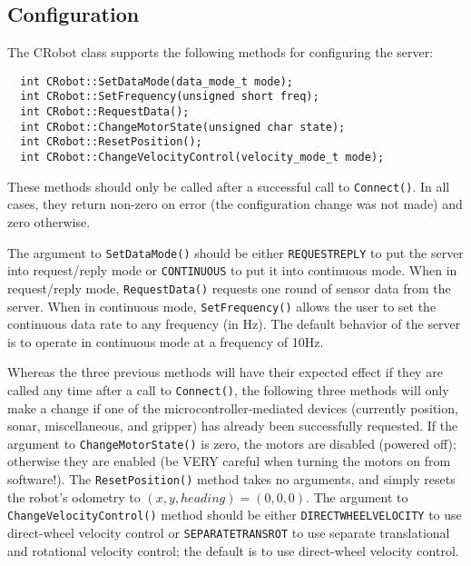 \documentclass[11pt]{article}
\begin{document}
\subsection{Configuration}
The CRobot class supports the following methods for configuring the 
server:

\begin{verbatim}
  int CRobot::SetDataMode(data_mode_t mode);
  int CRobot::SetFrequency(unsigned short freq);
  int CRobot::RequestData();
  int CRobot::ChangeMotorState(unsigned char state);
  int CRobot::ResetPosition();
  int CRobot::ChangeVelocityControl(velocity_mode_t mode);
\end{verbatim}

These methods should only be called after a successful call to
{\tt Connect()}.  In all cases, they return non-zero on error
(the configuration change was not made) and zero otherwise.

The argument to {\tt SetDataMode()} should be either {\tt REQUESTREPLY}
to put the server into request/reply mode or {\tt CONTINUOUS} to 
put it into continuous mode. When in request/reply mode,
{\tt RequestData()} requests one round of sensor data from the server.
When in continuous mode, {\tt SetFrequency()} allows
the user to set the continuous data rate to any frequency (in Hz). 
The default behavior of the server is to operate in continuous mode
at a frequency of 10Hz. 

Whereas the three previous methods will have their expected effect
if they are called any time after a call to {\tt Connect()}, the
following three methods will only make a change if one of the
microcontroller-mediated devices (currently position, sonar, miscellaneous,
and gripper) has already been successfully requested.
If the argument to {\tt ChangeMotorState()} is zero, the motors
are disabled (powered off); otherwise they are enabled (be VERY careful
when turning the motors on from software!).  The {\tt ResetPosition()}
method takes no arguments, and simply resets the robot's 
odometry to $(x,y,heading) = (0,0,0)$.
 The argument to {\tt ChangeVelocityControl()}
method should be either {\tt DIRECTWHEELVELOCITY} to use direct-wheel
velocity control or {\tt SEPARATETRANSROT} to use separate
translational and rotational velocity control; the default is to
use direct-wheel velocity control.
\end{document}
